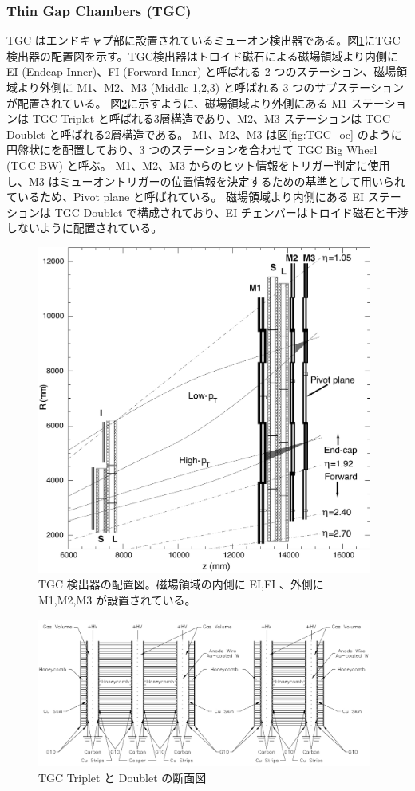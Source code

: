 \subsubsection{Thin Gap Chambers (TGC)}
TGC はエンドキャプ部に設置されているミューオン検出器である。図\ref{fig:TGC_st}にTGC検出器の配置図を示す。TGC検出器はトロイド磁石による磁場領域より内側に EI (Endcap Inner)、FI (Forward Inner)  と呼ばれる 2 つのステーション、磁場領域より外側に M1、M2、M3 (Middle 1,2,3) と呼ばれる 3 つのサブステーションが配置されている。
図\ref{fig:TGC}に示すように、磁場領域より外側にある M1 ステーションは TGC Triplet と呼ばれる3層構造であり、M2、M3 ステーションは TGC Doublet と呼ばれる2層構造である。
M1、M2、M3 は図\ref{fig:TGC_oc} のように円盤状にを配置しており、3 つのステーションを合わせて TGC Big Wheel (TGC BW) と呼ぶ。
M1、M2、M3 からのヒット情報をトリガー判定に使用し、M3 はミューオントリガーの位置情報を決定するための基準として用いられているため、Pivot plane と呼ばれている。
磁場領域より内側にある EI ステーションは TGC Doublet で構成されており、EI チェンバーはトロイド磁石と干渉しないように配置されている。

\begin{figure}[tb]
  \centering
  \includegraphics[clip, width=11cm]{fig/2/l1mue-schema.pdf}
  \caption{TGC 検出器の配置図。磁場領域の内側に EI,FI 、外側に M1,M2,M3 が設置されている。}
  \label{fig:TGC_st}
\end{figure}

\begin{figure}[tb]
  \centering
  \includegraphics[clip, width=11cm]{fig/2/TGC_construction.pdf}
  \caption{TGC Triplet と Doublet の断面図}
  \label{fig:TGC}
\end{figure}

